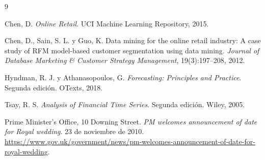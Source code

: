 \documentclass[11pt,letterpaper]{article}
\begin{document}
\begin{thebibliography}{9}

Chen, D.
\textit{Online Retail}.
UCI Machine Learning Repository, 2015.

Chen, D., Sain, S. L. y Guo, K.
Data mining for the online retail industry: A case study of RFM model-based customer segmentation using data mining.
\textit{Journal of Database Marketing \& Customer Strategy Management},
19(3):197--208, 2012.

Hyndman, R. J. y Athanasopoulos, G.
\textit{Forecasting: Principles and Practice}.
Segunda edición.
OTexts, 2018.

Tsay, R. S.
\textit{Analysis of Financial Time Series}.
Segunda edición.
Wiley, 2005.

Prime Minister's Office, 10 Downing Street.
\textit{PM welcomes announcement of date for Royal wedding}.
23 de noviembre de 2010.
\url{https://www.gov.uk/government/news/pm-welcomes-announcement-of-date-for-royal-wedding}.

\end{thebibliography}
\end{document}
